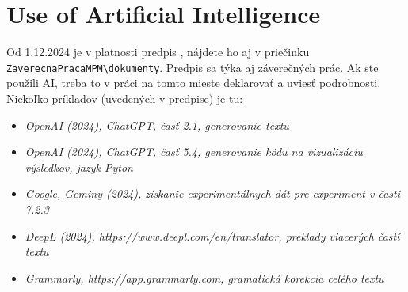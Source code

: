 \chapter*{Use of Artificial Intelligence}

Od 1.12.2024 je v platnosti predpis , nájdete ho aj v priečinku \verb|ZaverecnaPracaMPM\dokumenty|. Predpis sa týka aj záverečných prác. Ak ste použili AI, treba to v práci na tomto mieste deklarovať a uviesť podrobnosti. Niekoľko príkladov (uvedených v predpise) je tu:

\begin{itemize}
	\item \textit{OpenAI (2024), ChatGPT, časť 2.1, generovanie textu}
	
	\item \textit{OpenAI (2024), ChatGPT, časť 5.4, generovanie kódu na vizualizáciu výsledkov, jazyk Pyton}
	
	\item \textit{Google, Geminy (2024), získanie experimentálnych dát pre experiment v časti 7.2.3}
	
	\item \textit{DeepL (2024), https://www.deepl.com/en/translator, preklady viacerých častí textu}
	
	\item \textit{Grammarly, https://app.grammarly.com, gramatická korekcia celého textu}
\end{itemize}
	